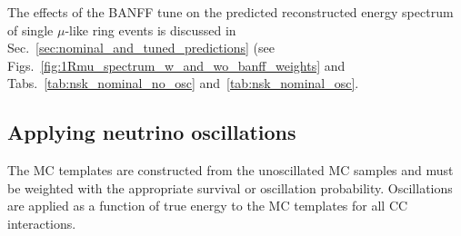 The effects of the BANFF tune on the predicted reconstructed energy spectrum of single $\mu$-like ring events is discussed 
in Sec.~\ref{sec:nominal_and_tuned_predictions} (see Figs.~\ref{fig:1Rmu_spectrum_w_and_wo_banff_weights} and Tabs.~\ref{tab:nsk_nominal_no_osc} and~\ref{tab:nsk_nominal_osc}. 

\subsection{Applying neutrino oscillations}
\label{sec:applying_oscillations}

The MC templates are constructed from the unoscillated MC samples and must be weighted with the appropriate survival or oscillation 
probability. Oscillations are applied as a function of true energy to the
  MC templates for all CC interactions.

